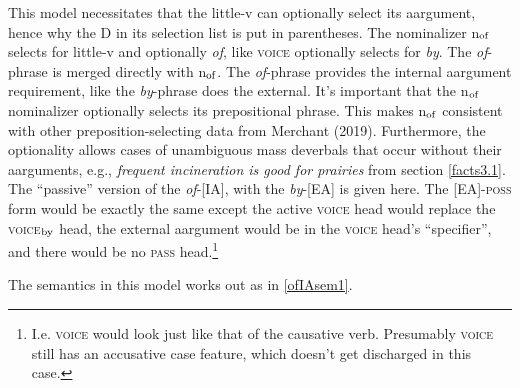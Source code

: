 \documentclass[12pt]{article}
\newcommand*{\textsub}[1]{\ensuremath{_\textrm{{\scriptsize #1}}}}
\begin{document}
\noindent This model necessitates that the little-v can optionally select its aargument, hence why the D in its selection list is put in parentheses. The nominalizer n\textsub{of} selects for little-v and optionally \textit{of}, like \textsc{voice} optionally selects for \textit{by}. The \textit{of}-phrase is merged directly with n\textsub{of}. The \textit{of}-phrase provides the internal aargument requirement, like the \textit{by}-phrase does the external. It's important that the n\textsub{of} nominalizer optionally selects its prepositional phrase. This makes n\textsub{of} consistent with other preposition-selecting data from Merchant (2019). Furthermore, the optionality allows cases of unambiguous mass deverbals that occur without their aarguments, e.g., \textit{frequent incineration is good for prairies} from section \ref{facts3.1}. The ``passive'' version of the \textit{of}-[IA], with the \textit{by}-[EA] is given here. The [EA]-\textsc{poss} form would be exactly the same except the active \textsc{voice} head would replace the \textsc{voice}\textsub{by} head, the external aargument would be in the \textsc{voice} head's ``specifier'', and there would be no \textsc{pass} head.\footnote{ I.e. \textsc{voice} would look just like that of the causative verb. Presumably \textsc{voice} still has an accusative case feature, which doesn't get discharged in this case.}

The semantics in this model works out as in \ref{ofIAsem1}.

\singlespacing
\end{document}
